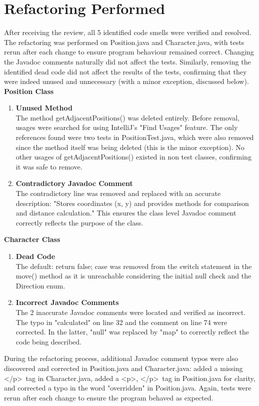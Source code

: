 \documentclass[12pt]{article}
\begin{document}
\newpage
\section{Refactoring Performed}
After receiving the review, all 5 identified code smells were verified and resolved. The refactoring was performed on Position.java and Character.java, 
with tests rerun after each change to ensure program behaviour remained correct. Changing the Javadoc comments naturally did not affect the tests. Similarly, removing the identified dead code did not affect the results of the tests, confirming that they were indeed unused and unnecessary (with a minor exception, discussed below). \\

\noindent\textbf{Position Class}
\begin{enumerate}
	\item \textbf{Unused Method} \\
	The method getAdjacentPositions() was deleted entirely. Before removal, usages were searched for using IntelliJ's "Find Usages" feature. The only references found were two tests in PositionTest.java, which were also removed since the method itself was being deleted (this is the minor exception). No other usages of getAdjacentPositions() existed in non test classes, confirming it was safe to remove.
	
	\item \textbf{Contradictory Javadoc Comment} \\
	The contradictory line was removed and replaced with an accurate description: "Stores coordinates (x, y) and provides methods for comparison and distance calculation." This ensures the class level Javadoc comment correctly reflects the purpose of the class.
\end{enumerate}

\noindent\textbf{Character Class}
\begin{enumerate}
	\item \textbf{Dead Code} \\
	The default: return false; case was removed from the switch statement in the move() method as it is unreachable considering the initial null check and the Direction enum.
	
	\item \textbf{Incorrect Javadoc Comments} \\
	The 2 inaccurate Javadoc comments were located and verified as incorrect. The typo in "calculated" on line 32 and the comment on line 74 were corrected. In the latter, "null" was replaced by "map" to correctly reflect the code being described.
\end{enumerate}

\noindent During the refactoring process, additional Javadoc comment typos were also discovered and corrected in Position.java and Character.java:
added a missing \textless /p\textgreater\ tag in Character.java, added a \textless p\textgreater, \textless /p\textgreater\ tag in Position.java for clarity, and corrected a typo in the word "overridden" in Position.java. Again, tests were rerun after each change to ensure the program behaved as expected.
\end{document}
